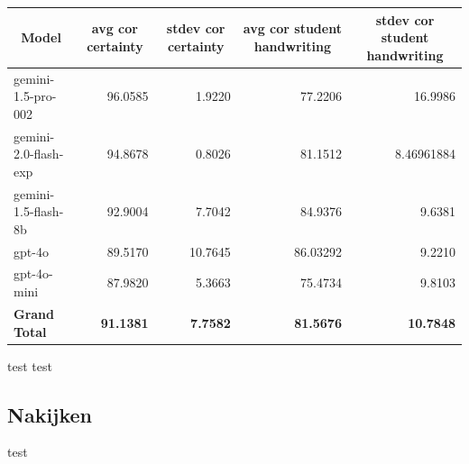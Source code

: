 \documentclass[12pt]{article}
\begin{document}
\noindent\begin{table}[H]\begin{tabularx}{\textwidth}{X *4{r}}
    \toprule
    \multicolumn{1}{c}{\textbf{Model}} & \multicolumn{1}{c}{\textbf{avg cor certainty}} & \multicolumn{1}{c}{\textbf{stdev cor certainty}} & \multicolumn{1}{c}{\textbf{avg cor student handwriting}} & \multicolumn{1}{c}{\textbf{stdev cor student handwriting}} \\
    \midrule
    gemini-1.5-pro-002 & 96.0585 & 1.9220 & 77.2206 & 16.9986 \\
    gemini-2.0-flash-exp & 94.8678 & 0.8026 & 81.1512 & 8.46961884 \\
    gemini-1.5-flash-8b & 92.9004 & 7.7042 & 84.9376 & 9.6381 \\
    gpt-4o & 89.5170 & 10.7645 & 86.03292 & 9.2210 \\
    gpt-4o-mini & 87.9820 & 5.3663 & 75.4734 & 9.8103 \\
    \midrule
    \textbf{Grand Total} & \textbf{91.1381} & \textbf{7.7582} & \textbf{81.5676} & \textbf{10.7848} \\
    \bottomrule
\end{tabularx}%
\end{table}

test
\pagebreak
test
\subsection{Nakijken}
test
\pagebreak
\end{document}
